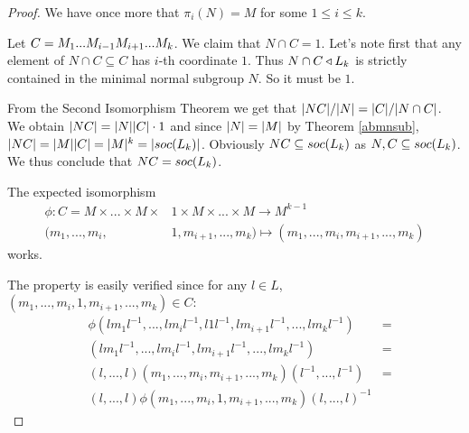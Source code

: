 \begin{proof}
    We have once more that $\pi_i(N) = M$ for some $1 \le i \le k$. 
    
    Let $C = \Mi[1]...\Mi[i-1]\Mi[i+1]...\Mi[k]$. We claim that $N \cap C = 1$. Let's note first that any element of $N \cap C \subseteq C$ has $i$-th coordinate $1$. Thus $N \cap C \nsub L_k$ is strictly contained in the minimal normal subgroup $N$. So it must be $1$.

    From the Second Isomorphism Theorem we get that $\card{NC}/\card{N} = \card{C} / \card{N \cap C}$.
    We obtain $\card{NC} = \card{N}\card{C}\cdot 1$ and since $\card{N} = \card{M}$ by Theorem \ref{abmnsub}, $\card{NC} = \card{M}\card{C} = \card{M}^k = \card{\soc{L_k}}$.
    Obviously $NC \subseteq \soc{L_k}$ as $N,C \subseteq \soc{L_k}$. We thus conclude that $NC = \soc{L_k}$.
    

    The expected isomorphism
    \begin{align*}
        \phi \colon C = M \times ... \times M \times &1 \times M \times ... \times M \longrightarrow M^{k-1} \\
        (m_1,...,m_i,&1,m_{i+1},...,m_{k}) \mapsto (m_1,...,m_i,m_{i+1},...,m_{k})
    \end{align*}
    works. 
    
    The property is easily verified since for any $l \in L$, $(m_1,...,m_i,1,m_{i+1},...,m_{k}) \in C$:
    \begin{align*}
        &\phi(lm_1l^{-1},...,lm_il^{-1},l1l^{-1},lm_{i+1}l^{-1},...,lm_{k}l^{-1}) &= \\
        &(lm_1l^{-1},...,lm_il^{-1},lm_{i+1}l^{-1},...,lm_{k}l^{-1}) &= \\
        &(l,...,l)(m_1,...,m_i,m_{i+1},...,m_{k})(l^{-1},...,l^{-1}) &= \\ 
        &(l,...,l)\phi(m_1,...,m_i,1,m_{i+1},...,m_{k})(l,...,l)^{-1}
    \end{align*}
\end{proof}
